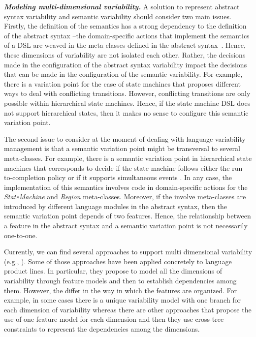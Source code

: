 \vspace{2mm}
\textbf{\textit{Modeling multi-dimensional variability.}} A solution to represent abstract syntax variability and semantic variability should consider two main issues. Firstly, the definition of the semantics has a strong dependency to the definition of the abstract syntax --the domain-specific actions that implement the semantics of a DSL are weaved in the meta-classes defined in the abstract syntax--. Hence, these dimensions of variability are not isolated each other. Rather, the decisions made in the configuration of the abstract syntax variability impact the decisions that can be made in the configuration of the semantic variability. For example, there is a variation point for the case of state machines that proposes different ways to deal with conflicting transitions. However, conflicting transitions are only possible within hierarchical state machines. Hence, if the state machine DSL does not support hierarchical states, then it makes no sense to configure this semantic variation point. 

The second issue to consider at the moment of dealing with language variability management is that a semantic variation point might be transversal to several meta-classes. For example, there is a semantic variation point in hierarchical state machines that corresponds to decide if the state machine follows either the run-to-completion policy or if it supports simultaneous events \cite{Crane:2007}. In any case, the implementation of this semantics involves code in domain-specific actions for the \textsl{StateMachine} and \textsl{Region} meta-classes. Moreover, if the involve meta-classes are introduced by different language modules in the abstract syntax, then the semantic variation point depends of two features. Hence, the relationship between a feature in the abstract syntax and a semantic variation point is not necessarily one-to-one. 

Currently, we can find several approaches to support multi dimensional variability (e.g., \cite{Rosenmuller:2011}). Some of those approaches have been applied concretely to language product lines. In particular, they propose to model all the dimensions of variability through feature models and then to establish dependencies among them. However, the differ in the way in which the features are organized. For example, in some cases there is a unique variability model with one branch for each dimension of variability whereas there are other approaches that propose the use of one feature model for each dimension and then they use cross-tree constraints to represent the dependencies among the dimensions. 

